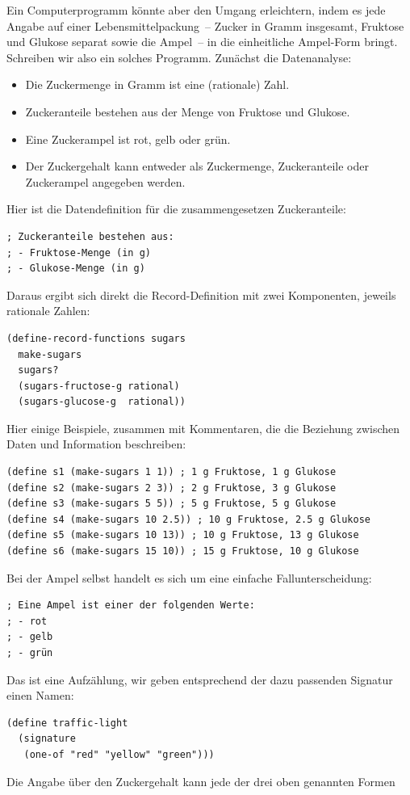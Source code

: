 Ein Computerprogramm könnte aber den Umgang erleichtern, indem es jede
Angabe auf einer Lebensmittelpackung~-- Zucker in Gramm insgesamt,
Fruktose und Glukose separat sowie die Ampel~-- in die einheitliche
Ampel-Form bringt.  Schreiben wir also ein solches Programm.  Zunächst
die Datenanalyse:
%
\begin{itemize}
\item Die Zuckermenge in Gramm ist eine (rationale) Zahl.
\item Zuckeranteile bestehen aus der Menge von Fruktose und Glukose.
\item Eine Zuckerampel ist rot, gelb oder grün.
\item Der Zuckergehalt kann entweder als Zuckermenge, Zuckeranteile
  oder Zuckerampel angegeben werden.
\end{itemize}
%
Hier ist die Datendefinition für die zusammengesetzen Zuckeranteile:
%
\begin{lstlisting}
; Zuckeranteile bestehen aus:
; - Fruktose-Menge (in g)
; - Glukose-Menge (in g)
\end{lstlisting}
%
Daraus ergibt sich direkt die Record-Definition mit zwei Komponenten,
jeweils rationale Zahlen:
%
\begin{lstlisting}
(define-record-functions sugars
  make-sugars
  sugars?
  (sugars-fructose-g rational)
  (sugars-glucose-g  rational))
\end{lstlisting}
%
Hier einige Beispiele, zusammen mit Kommentaren, die die Beziehung
zwischen Daten und Information beschreiben:
%
\begin{lstlisting}
(define s1 (make-sugars 1 1)) ; 1 g Fruktose, 1 g Glukose
(define s2 (make-sugars 2 3)) ; 2 g Fruktose, 3 g Glukose
(define s3 (make-sugars 5 5)) ; 5 g Fruktose, 5 g Glukose
(define s4 (make-sugars 10 2.5)) ; 10 g Fruktose, 2.5 g Glukose
(define s5 (make-sugars 10 13)) ; 10 g Fruktose, 13 g Glukose
(define s6 (make-sugars 15 10)) ; 15 g Fruktose, 10 g Glukose
\end{lstlisting}
%
Bei der Ampel selbst handelt es sich um eine einfache
Fallunterscheidung:
%
\begin{lstlisting}
; Eine Ampel ist einer der folgenden Werte:
; - rot
; - gelb
; - grün
\end{lstlisting}
%
Das ist eine Aufzählung, wir geben entsprechend der dazu passenden
Signatur einen Namen:
%
\begin{lstlisting}
(define traffic-light
  (signature
   (one-of "red" "yellow" "green")))
\end{lstlisting}
%
Die Angabe über den Zuckergehalt kann jede der drei oben genannten Formen

